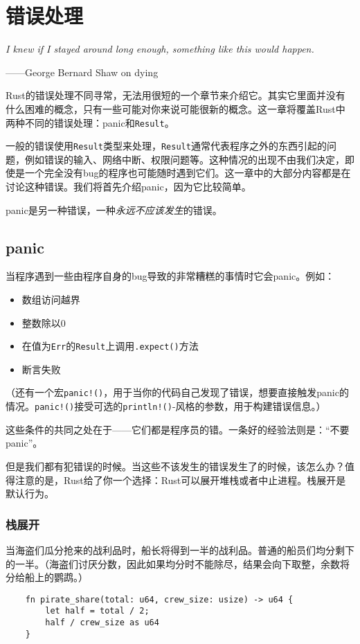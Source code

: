 \chapter{错误处理}\label{ch07}

\emph{I knew if I stayed around long enough, something like this would happen.}

\begin{flushright}
    ——George Bernard Shaw on dying
\end{flushright}

Rust的错误处理不同寻常，无法用很短的一个章节来介绍它。其实它里面并没有什么困难的概念，只有一些可能对你来说可能很新的概念。这一章将覆盖Rust中两种不同的错误处理：panic和\texttt{Result}。

一般的错误使用\texttt{Result}类型来处理，\texttt{Result}通常代表程序之外的东西引起的问题，例如错误的输入、网络中断、权限问题等。这种情况的出现不由我们决定，即使是一个完全没有bug的程序也可能随时遇到它们。这一章中的大部分内容都是在讨论这种错误。我们将首先介绍panic，因为它比较简单。

panic是另一种错误，一种\emph{永远不应该发生}的错误。

\section{panic}

当程序遇到一些由程序自身的bug导致的非常糟糕的事情时它会panic。例如：
\begin{itemize}
    \item 数组访问越界
    \item 整数除以0
    \item 在值为\texttt{Err}的\texttt{Result}上调用\texttt{.expect()}方法
    \item 断言失败
\end{itemize}

（还有一个宏\texttt{panic!()}，用于当你的代码自己发现了错误，想要直接触发panic的情况。\texttt{panic!()}接受可选的\texttt{println!()}-风格的参数，用于构建错误信息。）

这些条件的共同之处在于——它们都是程序员的错。一条好的经验法则是：“不要panic”。

但是我们都有犯错误的时候。当这些不该发生的错误发生了的时候，该怎么办？值得注意的是，Rust给了你一个选择：Rust可以展开堆栈或者中止进程。栈展开是默认行为。

\subsection{栈展开}
当海盗们瓜分抢来的战利品时，船长将得到一半的战利品。普通的船员们均分剩下的一半。（海盗们讨厌分数，因此如果均分时不能除尽，结果会向下取整，余数将分给船上的鹦鹉。）
\begin{verbatim}
    fn pirate_share(total: u64, crew_size: usize) -> u64 {
        let half = total / 2;
        half / crew_size as u64
    }
\end{verbatim}


